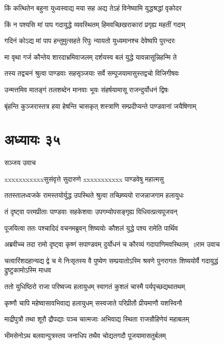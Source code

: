 \twolineshloka
{किं कत्थितेन बहुना युध्यस्वाद्य मया सह}
{अद्य तेऽहं विनेष्यामि युद्धश्रद्धां वृकोदर}


\twolineshloka
{किं न पश्यसि मां पाप गदायुद्धे व्यवस्थितम्}
{हिमवच्छिखराकारां प्रगृह्य महतीं गदाम्}


\twolineshloka
{गदिनं कोऽद्य मां पाप हन्तुमुत्सहते रिपुः}
{न्यायतो युध्यमानश्च देवेष्वपि पुरन्दरः}


\twolineshloka
{मा वृथा गर्ज कौन्तेय शारदाभ्रमिवाजलम्}
{दर्शयस्व बलं युद्धे यावन्नासून्निहन्मि ते}


\twolineshloka
{तस्य तद्वचनं श्रुत्वा पाण्डवाः सहसृञ्जयाः}
{सर्वे सम्पूजयामासुस्तद्वचो विजिगीषवः}


\twolineshloka
{उन्मत्तमिव मातङ्गं तलशब्देन मानवाः}
{भूयः संहर्षयामासू राजन्दुर्योधनं द्विषः}


\twolineshloka
{बृंहन्ति कुञ्जरास्तत्र हया हेषन्ति चासकृत्}
{शस्त्राणि सम्प्रदीप्यन्ते पाण्डवानां जयैषिणाम्}


\chapter{अध्यायः ३५}
\twolineshloka
{सञ्जय उवाच}
{}


\twolineshloka
{xxxxxxxxxxxसुसंवृत्ते सुदारुणे}
{xxxxxxxxxxx पाण्डवेषु महात्मसु}


\twolineshloka
{ततस्तालध्वजके रामस्तयोर्युद्ध उपस्थिते}
{श्रुत्वा तच्छिष्ययो राजन्नाजगाम हलायुधः}


\twolineshloka
{तं दृष्ट्वा परमप्रीताः पाण्डवाः सहकेशवाः}
{उपगम्योपसङ्गृह्य विधिवत्प्रत्यपूजयन्}


\twolineshloka
{पूजयित्वा ततः पश्चादिदं वचनमब्रुवन्}
{शिष्ययोः कौशलं युद्धे पश्य रामेति पार्थिव}


\threelineshloka
{अब्रवीच्च तदा रामो दृष्ट्वा कृष्णं सपाण्डवम्}
{दुर्योधनं च कौरव्यं गदापाणिमवस्थितम् ॥राम उवाच}
{}


\threelineshloka
{चत्वारिंशदहान्यद्य द्वे च मे निःसृतस्य वै}
{पुष्येण सम्प्रयातोऽस्मि श्रवणे पुनरागतः}
{शिष्ययोर्वै गदायुद्धं द्रुष्टुकामोऽस्मि माधव}


\twolineshloka
{ततो युधिष्ठिरो राजा परिष्वज्य हलायुधम्}
{स्वागतं कुशलं चास्मै पर्यपृच्छद्यथातथम्}


\twolineshloka
{कृष्णौ चापि महेष्वासावभिवाद्य हलायुधम्}
{सस्वजाते परिप्रीतौ प्रीयमाणौ यशस्विनौ}


\twolineshloka
{माद्रीपुत्रौ तथा शूरौ द्रौपद्याः पञ्च चात्मजाः}
{अभिवाद्य स्थिता राजन्रौहिणेयं महाबलम्}


\twolineshloka
{भीमसेनोऽथ बलवान्पुत्रस्तव जनाधिप}
{तथैव चोद्यतगदौ पूजयामासतुर्बलम्}


